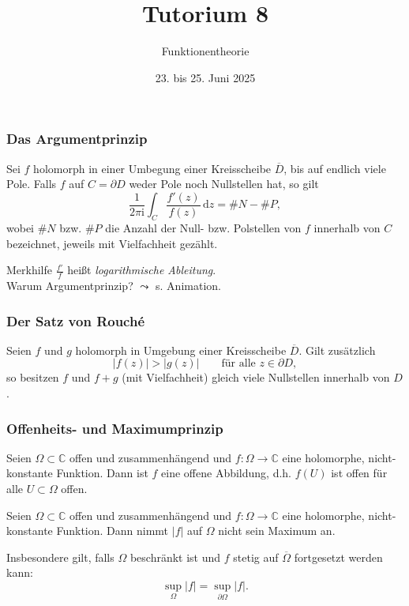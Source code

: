 \documentclass[10pt]{beamer}
\author[\url{https://fdf-uni.github.io/ft}]{}
\title{Tutorium 8}
\subtitle{\texorpdfstring{Funktionentheorie\vspace*{-1.5cm}}{Funktionentheorie}}
\date{23. bis 25. Juni 2025}
\newcommand{\iu}{\mathrm{i}}
\begin{document}
\begin{frame}
	\titlepage
\end{frame}
\begin{frame}
	\frametitle{Das Argumentprinzip}
	\begin{theorem}
		Sei $f$ holomorph in einer Umbegung einer Kreisscheibe $\overline{D}$, bis auf endlich viele Pole.
		Falls $f$ auf $C = \partial D$ weder Pole noch Nullstellen hat, so gilt
		\[
			\frac{1}{2 \pi \iu} \int_{C} \frac{f'(z)}{f(z)} \,\mathrm{d}z = \# N - \# P,
		\]
		wobei $\# N$ bzw. $\# P$ die Anzahl der Null- bzw. Polstellen von $f$ innerhalb von $C$ bezeichnet, jeweils mit Vielfachheit gezählt.
	\end{theorem}
	\pause
	Merkhilfe $\frac{f'}{f}$ heißt \emph{logarithmische Ableitung}.\\
	\pause
	Warum Argumentprinzip? \pause $\leadsto$ s. Animation.
\end{frame}
\begin{frame}
	\frametitle{Der Satz von Rouché}
	\pause
	\begin{theorem}
		Seien $f$ und $g$ holomorph in Umgebung einer Kreisscheibe $\overline{D}$.
		Gilt zusätzlich
		\[
			\lvert f(z) \rvert > \lvert g(z) \rvert \qquad \text{für alle } z \in \partial D,
		\]
		so besitzen $f$ und $f + g$ (mit Vielfachheit) gleich viele Nullstellen innerhalb von $D$.
	\end{theorem}
\end{frame}
\begin{frame}
	\frametitle{Offenheits- und Maximumprinzip}
	\pause
	\begin{theorem}
		Seien $\Omega \subset \mathbb{C}$ offen und zusammenhängend und $f \colon \Omega \to \mathbb{C}$ eine holomorphe, nicht-konstante Funktion.
		Dann ist $f$ eine offene Abbildung, d.h. $f(U)$ ist offen für alle $U \subset \Omega$ offen.
	\end{theorem}
	\pause
	\begin{theorem}[Maximumprinzip]
		Seien $\Omega \subset \mathbb{C}$ offen und zusammenhängend und $f \colon \Omega \to \mathbb{C}$ eine holomorphe, nicht-konstante Funktion.
		Dann nimmt $\lvert f \rvert$ auf $\Omega$ nicht sein Maximum an.

		Insbesondere gilt, falls $\Omega$ beschränkt ist und $f$ stetig auf $\overline{\Omega}$ fortgesetzt werden kann:
		\[
			\sup_{\Omega} \lvert f \rvert = \sup_{\partial \Omega} \lvert f \rvert.
		\]
	\end{theorem}
\end{frame}
\end{document}
